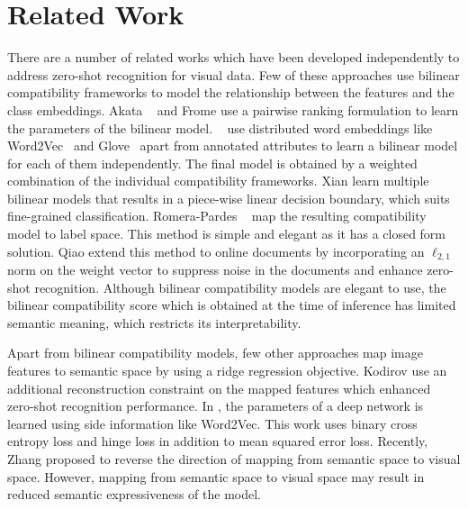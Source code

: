 \documentclass[10pt,twocolumn,letterpaper]{article}
\begin{document}
\section{Related Work}
\label{related}
There are a number of related works which have been developed independently to address zero-shot recognition for visual data. Few of these approaches use bilinear compatibility frameworks %
to model the relationship between the features and the class embeddings. Akata \etal~\cite{akata2016label,akata2013label} and Frome \etal \cite{frome2013devise} use a pairwise ranking formulation to learn the parameters of the bilinear model. %
~\cite{akata2015evaluation} use distributed word embeddings like Word2Vec~\cite{mikolov2013distributed} and Glove~\cite{pennington2014glove} apart from annotated attributes to learn a bilinear model for each of them independently. The final model is obtained by a weighted combination of the individual compatibility frameworks. Xian \etal \cite{xian2016latent} learn multiple bilinear models that results in a piece-wise linear decision boundary, which suits fine-grained classification. Romera-Pardes \etal~\cite{romera2015embarrassingly} map the resulting compatibility model to label space. This method is simple and elegant as it has a closed form solution. Qiao \etal \cite{qiao2016less} extend this method to online documents by incorporating an $\ell_{2,1}$ norm on the weight vector to suppress noise in the documents and enhance zero-shot recognition. Although bilinear compatibility models are elegant to use, the bilinear compatibility score which is obtained at the time of inference has limited semantic meaning, which restricts its interpretability. 

Apart from bilinear compatibility models, few other approaches map image features to semantic space by using a ridge regression objective. %
Kodirov \etal \cite{Kodirov_2017_CVPR} use an additional reconstruction constraint on the mapped features which enhanced zero-shot recognition performance. In \cite{lei2015predicting}, the parameters of a deep network is learned using side information like Word2Vec. This work uses binary cross entropy loss and hinge loss in addition to mean squared error loss. Recently, Zhang \etal\cite{zhang2016learning} proposed to reverse the direction of mapping from semantic space to visual space. 
However, mapping from semantic space to visual space may result in reduced semantic expressiveness of the model.
\end{document}
